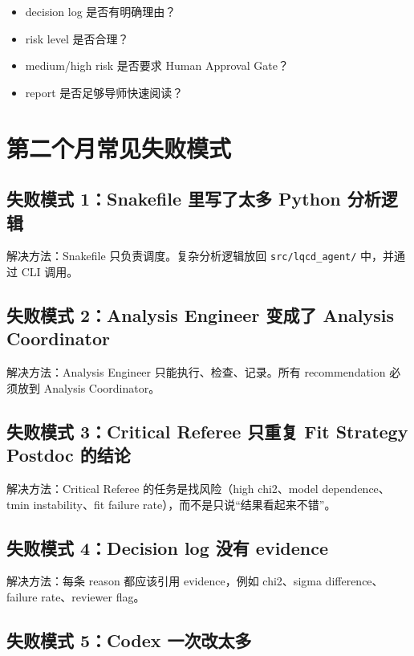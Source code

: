 \documentclass[11pt,a4paper,fontset=none]{ctexart}
\begin{document}
\begin{itemize}[leftmargin=2em]
  \item decision log 是否有明确理由？
  \item risk level 是否合理？
  \item medium/high risk 是否要求 Human Approval Gate？
  \item report 是否足够导师快速阅读？
\end{itemize}

\section{第二个月常见失败模式}

\subsection{失败模式 1：Snakefile 里写了太多 Python 分析逻辑}

解决方法：Snakefile 只负责调度。复杂分析逻辑放回 \texttt{src/lqcd\_agent/} 中，并通过 CLI 调用。

\subsection{失败模式 2：Analysis Engineer 变成了 Analysis Coordinator}

解决方法：Analysis Engineer 只能执行、检查、记录。所有 recommendation 必须放到 Analysis Coordinator。

\subsection{失败模式 3：Critical Referee 只重复 Fit Strategy Postdoc 的结论}

解决方法：Critical Referee 的任务是找风险（high chi2、model dependence、tmin instability、fit failure rate），而不是只说“结果看起来不错”。

\subsection{失败模式 4：Decision log 没有 evidence}

解决方法：每条 reason 都应该引用 evidence，例如 chi2、sigma difference、failure rate、reviewer flag。

\subsection{失败模式 5：Codex 一次改太多}
\end{document}
